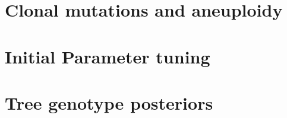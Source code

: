 \documentclass[../main.tex]{subfiles}
\begin{document}
\section{Clonal mutations and aneuploidy}


\section{Initial Parameter tuning}


\section{Tree genotype posteriors} 

\end{document}
